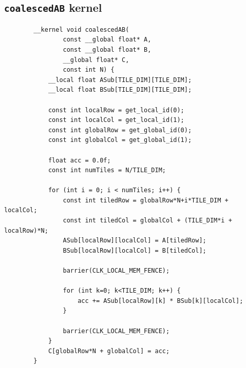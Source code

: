 \documentclass[review=false, sigchi]{acmart}
\begin{document}
\begin{appendix}
		
		\section{\texttt{coalescedAB} kernel} \label{coalescedABMultiply}
			
		\begin{lstlisting}
		__kernel void coalescedAB(
				const __global float* A,
				const __global float* B,
				__global float* C,
				const int N) {
			__local float ASub[TILE_DIM][TILE_DIM];
			__local float BSub[TILE_DIM][TILE_DIM];    
			
			const int localRow = get_local_id(0);
			const int localCol = get_local_id(1);
			const int globalRow = get_global_id(0);
			const int globalCol = get_global_id(1);
			
			float acc = 0.0f;
			const int numTiles = N/TILE_DIM;
			
			for (int i = 0; i < numTiles; i++) {
				const int tiledRow = globalRow*N+i*TILE_DIM + localCol;
				const int tiledCol = globalCol + (TILE_DIM*i + localRow)*N;
				ASub[localRow][localCol] = A[tiledRow];
				BSub[localRow][localCol] = B[tiledCol];
				
				barrier(CLK_LOCAL_MEM_FENCE);
				
				for (int k=0; k<TILE_DIM; k++) {
					acc += ASub[localRow][k] * BSub[k][localCol];
				}
				
				barrier(CLK_LOCAL_MEM_FENCE);
			}
			C[globalRow*N + globalCol] = acc;
		}
		\end{lstlisting}
	\end{appendix}
	
\end{document}
